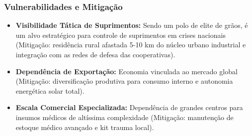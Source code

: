 \subsubsection{Vulnerabilidades e
Mitigação}

\begin{itemize}
\tightlist
\item
  \textbf{Visibilidade Tática de Suprimentos:} Sendo um polo de elite de
  grãos, é um alvo estratégico para controle de suprimentos em crises
  nacionais (Mitigação: residência rural afastada 5-10 km do núcleo
  urbano industrial e integração com as redes de defesa das
  cooperativas).
\item
  \textbf{Dependência de Exportação:} Economia vinculada ao mercado
  global (Mitigação: diversificação produtiva para consumo interno e
  autonomia energética solar total).
\item
  \textbf{Escala Comercial Especializada:} Dependência de grandes
  centros para insumos médicos de altíssima complexidade (Mitigação:
  manutenção de estoque médico avançado e kit trauma local).
\end{itemize}

